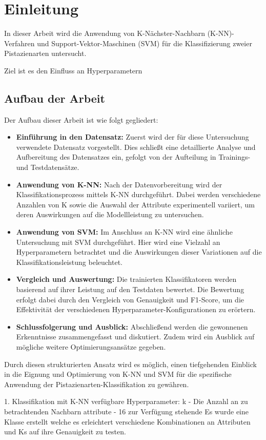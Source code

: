 
\section{Einleitung}
In dieser Arbeit wird die Anwendung von K-Nächster-Nachbarn (K-NN)-Verfahren und Support-Vektor-Maschinen (SVM) für die Klassifizierung zweier Pistazienarten untersucht. 

Ziel ist es den Einfluss an Hyperparametern 

\subsection*{Aufbau der Arbeit}
Der Aufbau dieser Arbeit ist wie folgt gegliedert:
\begin{itemize}
	\item \textbf{Einführung in den Datensatz:} Zuerst wird der für diese Untersuchung verwendete Datensatz vorgestellt. Dies schließt eine detaillierte Analyse und Aufbereitung des Datensatzes ein, gefolgt von der Aufteilung in Trainings- und Testdatensätze.
	\item \textbf{Anwendung von K-NN:} Nach der Datenvorbereitung wird der Klassifikationsprozess mittels K-NN durchgeführt. Dabei werden verschiedene Anzahlen von \glqq{}K\grqq{} sowie die Auswahl der Attribute experimentell variiert, um deren Auswirkungen auf die Modellleistung zu untersuchen.
	\item \textbf{Anwendung von SVM:} Im Anschluss an K-NN wird eine ähnliche Untersuchung mit SVM durchgeführt. Hier wird eine Vielzahl an Hyperparametern betrachtet und die Auswirkungen dieser Variationen auf die Klassifikationsleistung beleuchtet.
	\item \textbf{Vergleich und Auswertung:} Die trainierten Klassifikatoren werden basierend auf ihrer Leistung auf den Testdaten bewertet. Die Bewertung erfolgt dabei durch den Vergleich von Genauigkeit und F1-Score, um die Effektivität der verschiedenen Hyperparameter-Konfigurationen zu erörtern.
	\item \textbf{Schlussfolgerung und Ausblick:} Abschließend werden die gewonnenen Erkenntnisse zusammengefasst und diskutiert. Zudem wird ein Ausblick auf mögliche weitere Optimierungsansätze gegeben.
\end{itemize}

Durch diesen strukturierten Ansatz wird es möglich, einen tiefgehenden Einblick in die Eignung und Optimierung von K-NN und SVM für die spezifische Anwendung der Pistazienarten-Klassifikation zu gewähren.




1. Klassifikation mit K-NN
verfügbare Hyperparameter:
 k - Die Anzahl an zu betrachtenden Nachbarn
 attribute - 16 zur Verfügung stehende
Es wurde eine Klasse erstellt welche es erleichtert verschiedene Kombinationen an Attributen und Ks auf ihre Genauigkeit zu testen. 
